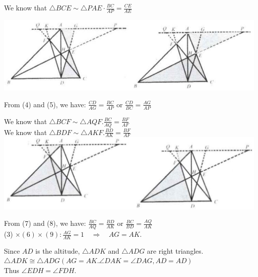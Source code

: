\documentclass{article}
\begin{document}
We know that \(\triangle B C E \sim \triangle P A E \cdot \frac{B C}{A P}=\frac{C E}{A E}\)


\begin{center}
\includegraphics[width=\textwidth]{images/125(1).jpg}
\end{center}

From (4) and (5), we have: \(\frac{C D}{A G}=\frac{B C}{A P}\) or \(\frac{C D}{B C}=\frac{A G}{A P}\)

We know that \(\triangle B C F \sim \triangle A Q F . \frac{B C}{A Q}=\frac{B F}{A F}\)\\
We know that \(\triangle B D F \sim \triangle A K F . \frac{B D}{A K}=\frac{B F}{A F}\)\\
\centering
\includegraphics[width=\textwidth]{images/125.jpg}

From (7) and (8), we have: \(\frac{B C}{A Q}=\frac{B D}{A K}\) or \(\frac{B C}{B D}=\frac{A Q}{A K}\)\\
(3) \(\times(6) \times(9): \frac{A G}{A K}=1 \quad \Rightarrow \quad A G=A K\).

Since \(A D\) is the altitude, \(\triangle A D K\) and \(\triangle A D G\) are right triangles.\\
\(\triangle A D K \cong \triangle A D G(A G=A K . \angle D A K=\angle D A G, A D=A D)\)\\
Thus \(\angle E D H=\angle F D H\).
\end{document}
